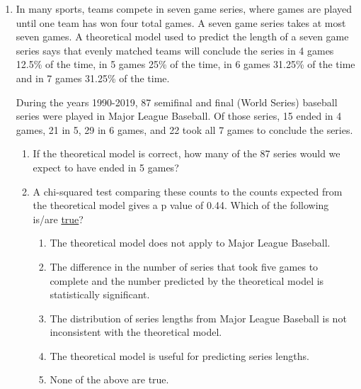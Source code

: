 \documentclass[12pt,fullpage]{amsart}
\begin{document}
\begin{enumerate}
      \vfill
      
\item In many sports, teams compete in seven game series, where games are played until one team has won four total games. A seven game series takes at most seven games. A theoretical model used to predict the length of a seven game series says that evenly matched teams will conclude the series in 4 games 12.5\% of the time, in 5 games 25\% of the time, in 6 games 31.25\% of the time and in 7 games 31.25\% of the time.

  During the years 1990-2019, 87 semifinal and final (World Series) baseball series were played in Major League Baseball. Of those series, 15 ended in 4 games, 21 in 5, 29 in 6 games, and 22 took all 7 games to conclude the series.

  \begin{enumerate}
  \item If the theoretical model is correct, how many of the 87 series would we expect to have ended in 5 games?
  \item A chi-squared test comparing these counts to the counts expected from the theoretical model gives a p value of 0.44. Which of the following is/are \underline{true}?
    \begin{enumerate}
    \item The theoretical model does not apply to Major League Baseball.
    \item The difference in the number of series that took five games to complete and the number predicted by the theoretical model is statistically significant.
    \item The distribution of series lengths from Major League Baseball is not inconsistent with the theoretical model.
    \item The theoretical model is useful for predicting series lengths.
    \item None of the above are true.
    \end{enumerate}
  \end{enumerate}

\vfill



\end{enumerate}
\end{document}
